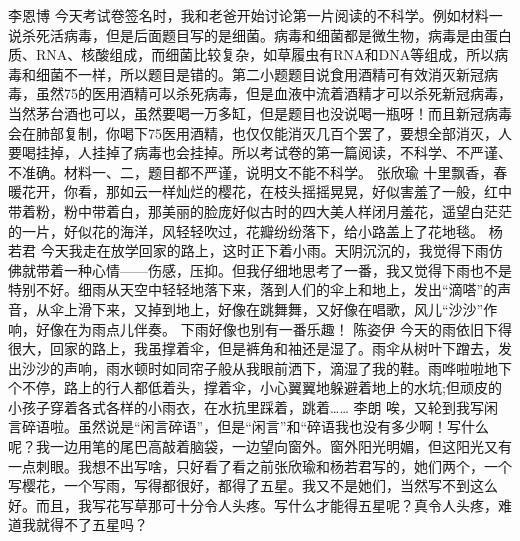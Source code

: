 {}李恩博\markdownRendererInterblockSeparator
{}今天考试卷签名时，我和老爸开始讨论第一片阅读的不科学。例如材料一说杀死活病毒，但是后面题目写的是细菌。病毒和细菌都是微生物，病毒是由蛋白质、RNA、核酸组成，而细菌比较复杂，如草履虫有RNA和DNA等组成，所以病毒和细菌不一样，所以题目是错的。第二小题题目说食用酒精可有效消灭新冠病毒，虽然75\markdownRendererPercentSign{}的医用酒精可以杀死病毒，但是血液中流着酒精才可以杀死新冠病毒，当然茅台酒也可以，虽然要喝一万多缸，但是题目也没说喝一瓶呀！而且新冠病毒会在肺部复制，你喝下75\markdownRendererPercentSign{}医用酒精，也仅仅能消灭几百个罢了，要想全部消灭，人要喝挂掉，人挂掉了病毒也会挂掉。所以考试卷的第一篇阅读，不科学、不严谨、不准确。材料一、二，题目都不严谨，说明文不能不科学。\markdownRendererInterblockSeparator
{}\markdownRendererInterblockSeparator
{}张欣瑜\markdownRendererInterblockSeparator
{}十里飘香，春暖花开，你看，那如云一样灿烂的樱花，在枝头摇摇晃晃，好似害羞了一般，红中带着粉，粉中带着白，那美丽的脸庞好似古时的四大美人样闭月羞花，遥望白茫茫的一片，好似花的海洋，风轻轻吹过，花瓣纷纷落下，给小路盖上了花地毯。\markdownRendererInterblockSeparator
{}\markdownRendererInterblockSeparator
{}杨若君\markdownRendererInterblockSeparator
{}今天我走在放学回家的路上，这时正下着小雨。天阴沉沉的，我觉得下雨仿佛就带着一种心情——伤感，压抑。但我仔细地思考了一番，我又觉得下雨也不是特别不好。细雨从天空中轻轻地落下来，落到人们的伞上和地上，发出“滴嗒”的声音，从伞上滑下来，又掉到地上，好像在跳舞舞，又好像在唱歌，风儿“沙沙”作响，好像在为雨点儿伴奏。\markdownRendererInterblockSeparator
{}下雨好像也别有一番乐趣！ \markdownRendererInterblockSeparator
{}\markdownRendererInterblockSeparator
{}陈姿伊\markdownRendererInterblockSeparator
{}今天的雨依旧下得很大，回家的路上，我虽撑着伞，但是裤角和袖还是湿了。雨伞从树叶下蹭去，发出沙沙的声响，雨水顿时如同帘子般从我眼前洒下，滴湿了我的鞋。雨哗啦啦地下个不停，路上的行人都低着头，撑着伞，小心翼翼地躲避着地上的水坑;但顽皮的小孩子穿着各式各样的小雨衣，在水抗里踩着，跳着……\markdownRendererInterblockSeparator
{}\markdownRendererInterblockSeparator
{}李朗\markdownRendererInterblockSeparator
{}唉，又轮到我写闲言碎语啦。虽然说是“闲言碎语”，但是“闲言”和“碎语我也没有多少啊！写什么呢？我一边用笔的尾巴高敲着脑袋，一边望向窗外。窗外阳光明媚，但这阳光又有一点刺眼。我想不出写啥，只好看了看之前张欣瑜和杨若君写的，她们两个，一个写樱花，一个写雨，写得都很好，都得了五星。我又不是她们，当然写不到这么好。而且，我写花写草那可十分令人头疼。写什么才能得五星呢？真令人头疼，难道我就得不了五星吗？\markdownRendererInterblockSeparator
